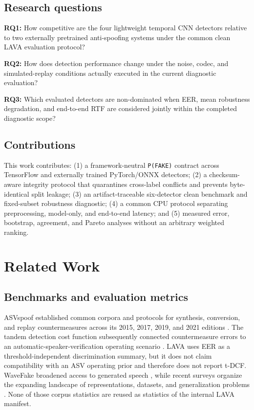 \documentclass[10pt,journal,onecolumn]{IEEEtran}
\begin{document}
\subsection{Research questions}
\textbf{RQ1:} How competitive are the four lightweight temporal CNN detectors relative to two externally pretrained anti-spoofing systems under the common clean LAVA evaluation protocol?

\textbf{RQ2:} How does detection performance change under the noise, codec, and simulated-replay conditions actually executed in the current diagnostic evaluation?

\textbf{RQ3:} Which evaluated detectors are non-dominated when EER, mean robustness degradation, and end-to-end RTF are considered jointly within the completed diagnostic scope?

\subsection{Contributions}
This work contributes: (1) a framework-neutral \texttt{P(FAKE)} contract across TensorFlow and externally trained PyTorch/ONNX detectors; (2) a checksum-aware integrity protocol that quarantines cross-label conflicts and prevents byte-identical split leakage; (3) an artifact-traceable six-detector clean benchmark and fixed-subset robustness diagnostic; (4) a common CPU protocol separating preprocessing, model-only, and end-to-end latency; and (5) measured error, bootstrap, agreement, and Pareto analyses without an arbitrary weighted ranking.

\section{Related Work}
\subsection{Benchmarks and evaluation metrics}
ASVspoof established common corpora and protocols for synthesis, conversion, and replay countermeasures across its 2015, 2017, 2019, and 2021 editions \cite{wu2015asvspoof,kinnunen2017asvspoof,todisco2019asvspoof,yamagishi2021asvspoof}. The tandem detection cost function subsequently connected countermeasure errors to an automatic-speaker-verification operating scenario \cite{kinnunen2018tdcf}. LAVA uses EER as a threshold-independent discrimination summary, but it does not claim compatibility with an ASV operating prior and therefore does not report t-DCF. WaveFake broadened access to generated speech \cite{frank2021wavefake}, while recent surveys organize the expanding landscape of representations, datasets, and generalization problems \cite{yi2023survey,li2024survey}. None of those corpus statistics are reused as statistics of the internal LAVA manifest.
\end{document}
